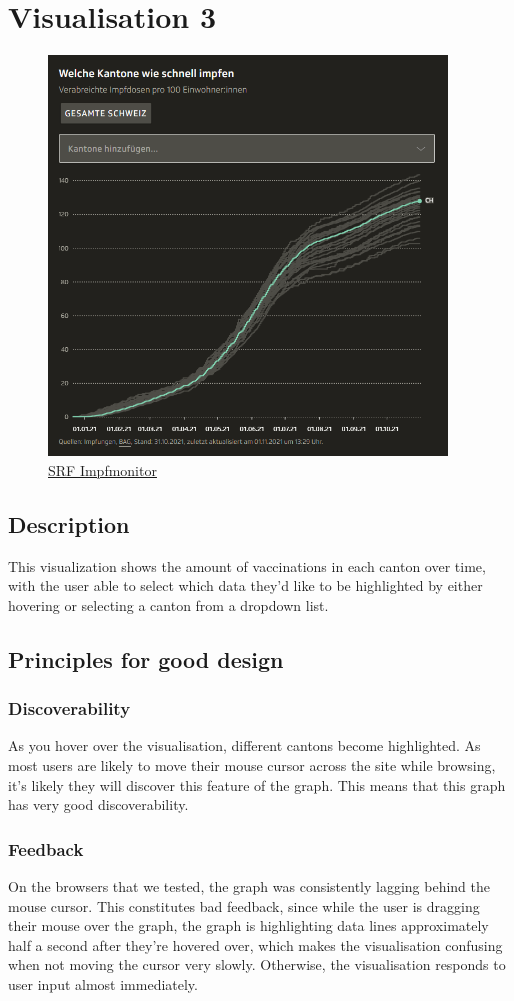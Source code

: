 \documentclass[12pt, letterpaper]{article}
\begin{document}
\section{Visualisation 3}
\begin{figure}[h]
    \centering
    \includegraphics[width=400px]{images/SRF_png1.png}
    \caption{\href{https://www.srf.ch/news/schweiz/impfmonitor-so-impft-die-schweiz-gegen-corona-2}{SRF Impfmonitor}}
    \label{fig:my_label}
\end{figure}

\subsection{Description}
This visualization shows the amount of vaccinations in each canton over time, with the user able to select which data they'd like to be highlighted by either hovering or selecting a canton from a dropdown list.
\subsection{Principles for good design}
\subsubsection{Discoverability}
As you hover over the visualisation, different cantons become highlighted. As most users are likely to move their mouse cursor across the site while browsing, it's likely they will discover this feature of the graph. This means that this graph has very good discoverability.
\subsubsection{Feedback}
On the browsers that we tested, the graph was consistently lagging behind the mouse cursor. This constitutes bad feedback, since while the user is dragging their mouse over the graph, the graph is highlighting data lines approximately half a second after they're hovered over, which makes the visualisation confusing when not moving the cursor very slowly. Otherwise, the visualisation responds to user input almost immediately.
\end{document}

